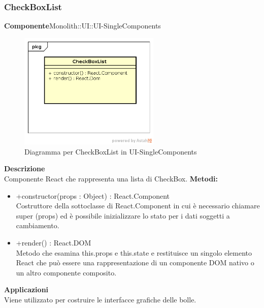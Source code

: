 \subsubsection{CheckBoxList}
\textbf{Componente}Monolith::UI::UI-SingleComponents\\
   \FloatBarrier
   \begin{figure}[ht]
   \centering
   \includegraphics[width=0.6\textwidth]{img/single-CheckBoxList}
   \caption{{Diagramma per CheckBoxList in UI-SingleComponents}}
\end{figure}
\FloatBarrier
\textbf{Descrizione}\\
Componente React che rappresenta una lista di CheckBox. 
\textbf{Metodi:} \begin{itemize}\item +constructor(props : Object) : React.Component \\Costruttore della sottoclasse di React.Component in cui è necessario chiamare super (props) ed è possibile inizializzare lo stato per i dati soggetti a cambiamento.\item +render() : React.DOM \\Metodo che esamina this.props e this.state e restituisce un singolo elemento React che può essere una rappresentazione di un componente DOM nativo o un altro componente composito.

\end{itemize} 


\textbf{Applicazioni}\\
Viene utilizzato per costruire le interfacce grafiche delle bolle. 


\clearpage

